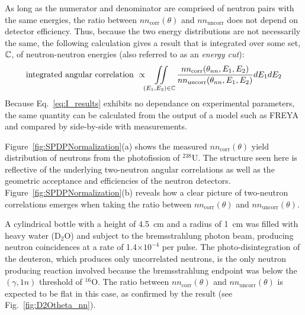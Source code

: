 As long as the numerator and denominator are comprised of neutron pairs with the same energies, the ratio between $nn_{\text{corr}}(\theta)$ and $nn_{\text{uncorr}}$ does not depend on detector efficiency.
Thus, because the two energy distributions are not necessarily the same, the following calculation gives a result that is integrated over some set, $\mathbb{C}$, of neutron-neutron energies (also referred to as an \emph{energy cut}):
\begin{equation}
\label{eq:I_results}
\text{integrated angular correlation }\propto  \iint \limits_{(E_1,E_2 ) \in \mathbb{C}}  \frac{nn_{\text{corr}}(\theta_{nn}, E_1, E_2)}{nn_{\text{uncorr}}(\theta_{nn},E_1, E_2)} dE_1 dE_2
\end{equation}
Because Eq.~\ref{eq:I_results} exhibits no dependance on experimental parameters, the same quantity can be calculated from the output of a model such as FREYA and compared by side-by-side with measurements.

Figure~\ref{fig:SPDPNormalization}(a) shows the measured $nn_{\text{corr}}(\theta)$ yield distribution of neutrons from the photofission of $^{238}$U.
The structure seen here is reflective of the underlying two-neutron angular correlations as well as the geometric acceptance and efficiencies of the neutron detectors.
Figure~\ref{fig:SPDPNormalization}(b) reveals how a clear picture of two-neutron correlations emerges when taking the ratio between $nn_{\text{corr}}(\theta)$ and $nn_{\text{uncorr}}(\theta)$.

A cylindrical bottle with a height of 4.5~cm and a radius of 1~cm was filled with heavy water 
(D$_{2}$O) and subject to the bremsstrahlung photon beam, producing neutron coincidences at a rate of 1.4$\times10^{-4}$ per pulse.
The photo-disintegration of the deuteron, which produces only uncorrelated neutrons, is the only  neutron producing reaction involved because the bremsstrahlung endpoint was below the $(\gamma, 1n)$ threshold of $^{16}$O.
The ratio between $nn_{\text{corr}}(\theta)$ and $nn_{\text{uncorr}}(\theta)$ is expected to be flat in this case, as confirmed by the result (see Fig.~\ref{fig:D2Otheta_nn}).

